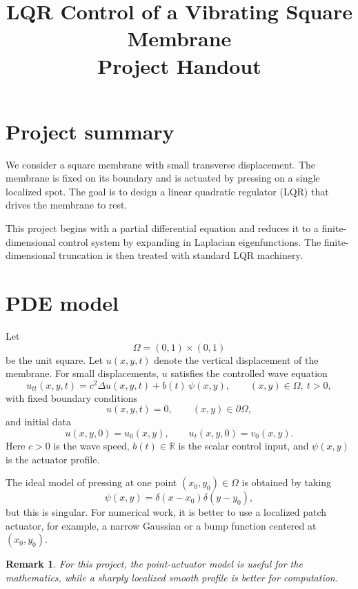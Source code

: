 \documentclass[11pt]{article}
\title{LQR Control of a Vibrating Square Membrane\\\large Project Handout}
\author{}
\date{}
\newcommand{\R}{\mathbb{R}}
\newtheorem*{remark}{Remark}
\begin{document}
\maketitle

\section*{Project summary}
We consider a square membrane with small transverse displacement. The 
membrane is fixed on its boundary and is actuated by pressing on a 
single localized spot. The goal is to design a linear quadratic regulator 
(LQR) that drives the membrane to rest.

This project begins with a partial differential equation and reduces it 
to a finite-dimensional control system by expanding in Laplacian 
eigenfunctions. The finite-dimensional truncation is then treated with 
standard LQR machinery.

\section{PDE model}
Let
\[
\Omega = (0,1)\times(0,1)
\]
be the unit square. Let $u(x,y,t)$ denote the vertical displacement of 
the membrane. For small displacements, $u$ satisfies the controlled 
wave equation
\begin{equation}
\label{eq:wave}
 u_{tt}(x,y,t) = c^2 \Delta u(x,y,t) + b(t)\,\psi(x,y), 
 \qquad (x,y)\in\Omega,\ t>0,
\end{equation}
with fixed boundary conditions
\begin{equation}
\label{eq:bc}
 u(x,y,t)=0,\qquad (x,y)\in \partial\Omega,
\end{equation}
and initial data
\begin{equation}
\label{eq:ic}
 u(x,y,0)=u_0(x,y),\qquad u_t(x,y,0)=v_0(x,y).
\end{equation}
Here $c>0$ is the wave speed, $b(t)\in\R$ is the scalar control input, 
and $\psi(x,y)$ is the actuator profile.

The ideal model of pressing at one point $(x_0,y_0)\in\Omega$ is 
obtained by taking
\[
\psi(x,y)=\delta(x-x_0)\delta(y-y_0),
\]
but this is singular. For numerical work, it is better to use a 
localized patch actuator, for example, a narrow Gaussian or a bump 
function centered at $(x_0,y_0)$.

\begin{remark}
For this project, the point-actuator model is useful for the 
mathematics, while a sharply localized smooth profile is better for 
computation.
\end{remark}
\end{document}
